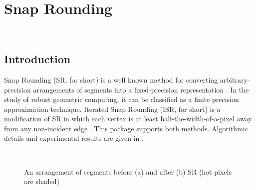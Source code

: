 
\ccParDims


\chapter{Snap Rounding}
\label{chapterSnapRoundibg}
\\
\newcommand{\reals}{{\rm I\!\hspace{-0.025em} R}}
\def\A{{\cal A}}
\def\S{{\cal S}}

\section{Introduction}
Snap Rounding (SR, for short) is a well known method for converting
arbitrary-precision arrangements of segments into a fixed-precision
representation \cite{gght-srlse-97, gm-rad-98, h-psifp-99}. In the study of robust
geometric computing, it can be classified
as a finite precision approximation technique. Iterated Snap Rounding
(ISR, for short) is
a modification of SR in which each vertex is at least
half-the-width-of-a-pixel away from any non-incident edge \cite{isr-2002}.
This package supports both methods. Algorithmic details and experimental results are
given in \cite{isr-2002}.

\begin{figure}
\begin{center}
\  \
\end{center}
\vspace{-2ex}
\caption{An arrangement of segments before (a) and after (b)
SR (hot pixels are shaded)}
\label{fig:sr1}
\end{figure}

